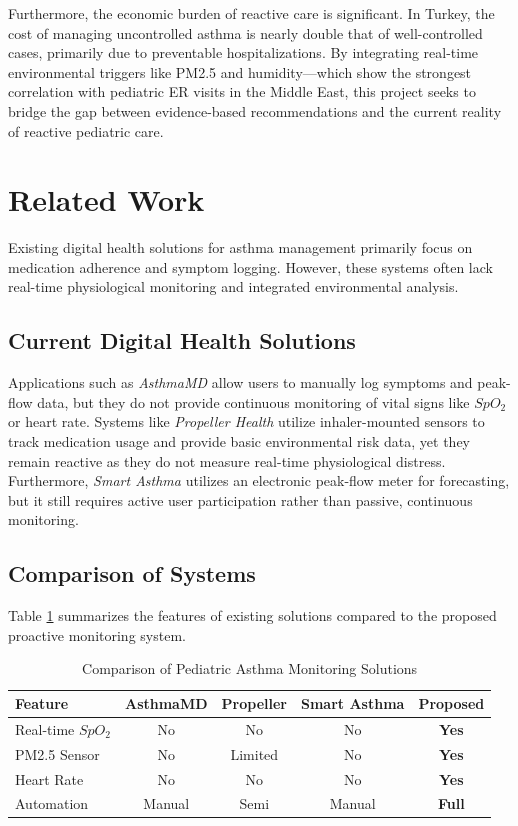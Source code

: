 \documentclass[two column]{article}
\begin{document}
Furthermore, the economic burden of reactive care is significant. In Turkey, the cost of managing uncontrolled asthma is nearly double that of well-controlled cases, primarily due to preventable hospitalizations. By integrating real-time environmental triggers like PM2.5 and humidity—which show the strongest correlation with pediatric ER visits in the Middle East,\cite{SaudiAsthma2025} this project seeks to bridge the gap between evidence-based recommendations and the current reality of reactive pediatric care.


\section{Related Work}
Existing digital health solutions for asthma management primarily focus on medication adherence and symptom logging. However, these systems often lack real-time physiological monitoring and integrated environmental analysis.

\subsection{Current Digital Health Solutions}
Applications such as \textit{AsthmaMD} allow users to manually log symptoms and peak-flow data, but they do not provide continuous monitoring of vital signs like $SpO_2$ or heart rate. Systems like \textit{Propeller Health} utilize inhaler-mounted sensors to track medication usage and provide basic environmental risk data, yet they remain reactive as they do not measure real-time physiological distress. Furthermore, \textit{Smart Asthma} utilizes an electronic peak-flow meter for forecasting, but it still requires active user participation rather than passive, continuous monitoring.

\subsection{Comparison of Systems}
Table \ref{tab:comparison} summarizes the features of existing solutions compared to the proposed proactive monitoring system.

\begin{table}[htbp]
\caption{Comparison of Pediatric Asthma Monitoring Solutions}
\label{tab:comparison}
\begin{center}
\begin{tabular}{|l|c|c|c|c|}
\hline
\textbf{Feature} & \textbf{AsthmaMD} & \textbf{Propeller} & \textbf{Smart Asthma} & \textbf{Proposed} \\
\hline
Real-time $SpO_2$ & No & No & No & \textbf{Yes} \\
\hline
PM2.5 Sensor & No & Limited & No & \textbf{Yes} \\
\hline
Heart Rate & No & No & No & \textbf{Yes} \\
\hline
Automation & Manual & Semi & Manual & \textbf{Full} \\
\hline
\end{tabular}
\end{center}
\end{table}







\end{document}
